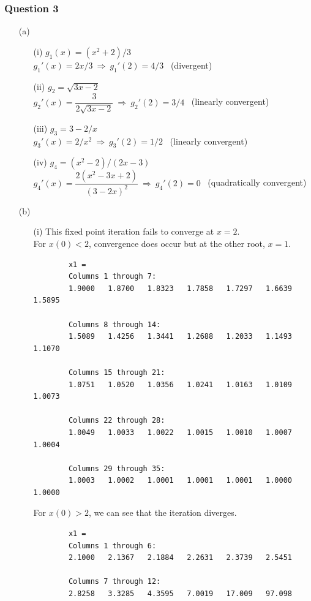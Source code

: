 \documentclass[11pt,a4paper]{article}
\begin{document}
\subsubsection*{Question 3}
\begin{enumerate}
	\item[(a)]
	\begin{enumerate}
		\item[(i)] $g_1(x)=(x^2+2)/3$ \\
		$g_1'(x)=2x/3 \ \Rightarrow \ g_1'(2)=4/3$ \ (divergent)
		\item[(ii)] $g_2=\sqrt{3x-2}$ \\
		$g_2'(x)=\dfrac{3}{2\sqrt{3x-2}} \ \Rightarrow \ g_2'(2)=3/4$ \ (linearly convergent)
		\item[(iii)] $g_3=3-2/x$ \\
		$g_3'(x)=2/x^2 \ \Rightarrow \ g_3'(2)=1/2$ \ (linearly convergent)
		\item[(iv)] $g_4=(x^2-2)/(2x-3)$ \\
		$g_4'(x)=\dfrac{2(x^2-3x+2)}{(3-2x)^2} \ \Rightarrow \ g_4'(2)=0$ \ (quadratically convergent)
	\end{enumerate}
	\item[(b)]
	\begin{enumerate}
		\item[(i)] This fixed point iteration fails to converge at $x=2$. \\
		For $x(0)<2$, convergence does occur but at the other root, $x=1$.
		\begin{verbatim}
		x1 =
		Columns 1 through 7:
		1.9000   1.8700   1.8323   1.7858   1.7297   1.6639   1.5895

		Columns 8 through 14:
		1.5089   1.4256   1.3441   1.2688   1.2033   1.1493   1.1070
		
		Columns 15 through 21:
		1.0751   1.0520   1.0356   1.0241   1.0163   1.0109   1.0073
		
		Columns 22 through 28:
		1.0049   1.0033   1.0022   1.0015   1.0010   1.0007   1.0004
		
		Columns 29 through 35:
		1.0003   1.0002   1.0001   1.0001   1.0001   1.0000   1.0000
		\end{verbatim}
	
		For $x(0)>2$, we can see that the iteration diverges.
		\begin{verbatim}
		x1 =
		Columns 1 through 6:
		2.1000   2.1367   2.1884   2.2631   2.3739   2.5451   

		Columns 7 through 12:
		2.8258   3.3285   4.3595   7.0019   17.009   97.098


\end{verbatim}
\end{enumerate}
\end{enumerate}
\end{document}
